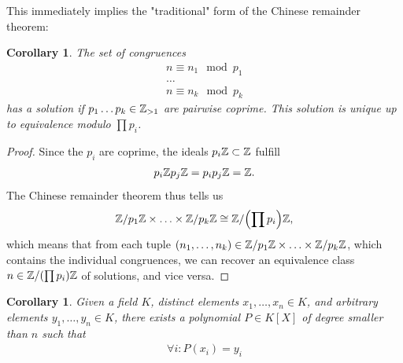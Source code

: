 \documentclass[10pt]{report}
\newtheorem{corollary}[lemma]{Corollary}
\theoremstyle{definition}
\begin{document}
	This immediately implies the "traditional" form of the Chinese remainder theorem:
	\begin{corollary}{}{}
		The set of congruences
		\begin{align*}
			n \equiv n_1 \mod p_1\\
			\hdots\\
			n \equiv n_k \mod p_k
		\end{align*}
		has a solution if $p_1 \hdots p_k \in \mathbb{Z}_{> 1}$ are pairwise coprime. This solution is unique up to equivalence modulo $\prod p_i$.
	\end{corollary}
	\begin{proof}
		Since the $p_i$ are coprime, the ideals $p_i\mathbb{Z} \subset \mathbb{Z}$ fulfill 
		\begin{align*}
			p_i\mathbb{Z} p_j \mathbb{Z} = p_ip_j\mathbb{Z} = \mathbb{Z}.
		\end{align*} 
		The Chinese remainder theorem thus tells us
		\begin{align*}
			\mathbb{Z}/p_1 \mathbb{Z} \times \hdots \times \mathbb{Z}/p_k\mathbb{Z} \cong \mathbb{Z}/\qty(\prod p_i)\mathbb{Z},
		\end{align*}
		which means that from each tuple $(n_1, \hdots, n_k) \in \mathbb{Z}/p_1 \mathbb{Z} \times \hdots \times \mathbb{Z}/p_k\mathbb{Z}$, which contains the individual congruences, we can recover an equivalence class $n \in \mathbb{Z}/\qty(\prod p_i)\mathbb{Z}$ of solutions, and vice versa.
	\end{proof}
	\begin{corollary}
		Given a field $K$, distinct elements $x_1, \hdots, x_n \in K$, and arbitrary elements $y_1, \hdots, y_n \in K$, there exists a polynomial $P \in K[X]$ of degree smaller than $n$ such that
		\begin{align*}
			\forall i : P(x_i) = y_i
		\end{align*}
	\end{corollary}
	\clearpage
\end{document}
